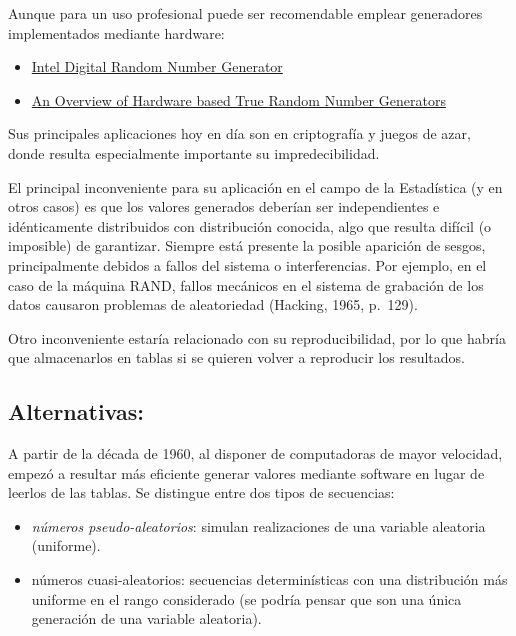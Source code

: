 \documentclass[
]{book}
\theoremstyle{break}
\theoremstyle{definition}
\theoremstyle{definition}
\theoremstyle{definition}
\theoremstyle{remark}
\begin{document}
Aunque para un uso profesional puede ser recomendable emplear generadores implementados mediante hardware:

\begin{itemize}
\item
  \href{http://software.intel.com/en-us/articles/intel-digital-random-number-generator-drng-software-implementation-guide}{Intel Digital Random Number Generator}
\item
  \href{https://rbridge.inlab.net/manual/trngs}{An Overview of Hardware based True Random Number Generators}
\end{itemize}

Sus principales aplicaciones hoy en día son en criptografía y juegos de azar, donde resulta especialmente importante su impredecibilidad.

El principal inconveniente para su aplicación en el campo de la Estadística (y en otros casos) es que los valores generados deberían ser independientes e idénticamente distribuidos con distribución conocida, algo que resulta difícil (o imposible) de garantizar.
Siempre está presente la posible aparición de sesgos, principalmente debidos a fallos del sistema o interferencias.
Por ejemplo, en el caso de la máquina RAND, fallos mecánicos en el sistema de grabación de los datos causaron problemas de aleatoriedad (Hacking, 1965, p.~129).

Otro inconveniente estaría relacionado con su reproducibilidad, por lo que habría que almacenarlos en tablas si se quieren volver a reproducir los resultados.

\hypertarget{alternativas}{%
\subsection{Alternativas:}\label{alternativas}}

A partir de la década de 1960, al disponer de computadoras de mayor velocidad, empezó a resultar más eficiente generar valores mediante software en lugar de leerlos de las tablas.
Se distingue entre dos tipos de secuencias:

\begin{itemize}
\item
  \emph{números pseudo-aleatorios}: simulan realizaciones de una variable aleatoria (uniforme).
\item
  números cuasi-aleatorios: secuencias determinísticas con una distribución más uniforme en el rango considerado (se podría pensar que son una única generación de una variable aleatoria).
\end{itemize}
\end{document}
